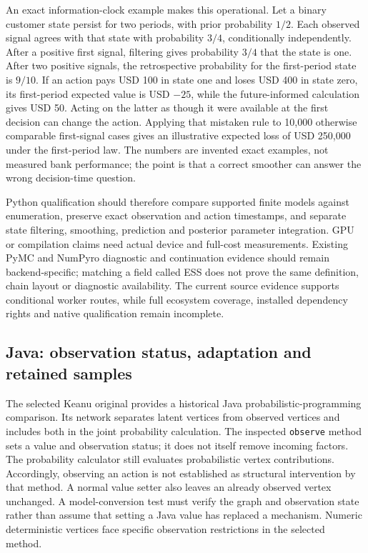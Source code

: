 An exact information-clock example makes this operational. Let a binary customer state persist for two periods, with prior probability $1/2$. Each observed signal agrees with that state with probability $3/4$, conditionally independently. After a positive first signal, filtering gives probability $3/4$ that the state is one. After two positive signals, the retrospective probability for the first-period state is $9/10$. If an action pays USD 100 in state one and loses USD 400 in state zero, its first-period expected value is USD $-25$, while the future-informed calculation gives USD 50. Acting on the latter as though it were available at the first decision can change the action. Applying that mistaken rule to 10,000 otherwise comparable first-signal cases gives an illustrative expected loss of USD 250,000 under the first-period law. The numbers are invented exact examples, not measured bank performance; the point is that a correct smoother can answer the wrong decision-time question.~\citep{exec25_bsw_choice}

Python qualification should therefore compare supported finite models against enumeration, preserve exact observation and action timestamps, and separate state filtering, smoothing, prediction and posterior parameter integration. GPU or compilation claims need actual device and full-cost measurements. Existing PyMC and NumPyro diagnostic and continuation evidence should remain backend-specific; matching a field called ESS does not prove the same definition, chain layout or diagnostic availability. The current source evidence supports conditional worker routes, while full ecosystem coverage, installed dependency rights and native qualification remain incomplete.~\citep{exec23_pymc_sources,exec23_numpyro_sources,exec25_bsw_choice}

\subsection{Java: observation status, adaptation and retained samples}

The selected Keanu original provides a historical Java probabilistic-programming comparison. Its network separates latent vertices from observed vertices and includes both in the joint probability calculation. The inspected \texttt{observe} method sets a value and observation status; it does not itself remove incoming factors. The probability calculator still evaluates probabilistic vertex contributions. Accordingly, observing an action is not established as structural intervention by that method. A normal value setter also leaves an already observed vertex unchanged. A model-conversion test must verify the graph and observation state rather than assume that setting a Java value has replaced a mechanism. Numeric deterministic vertices face specific observation restrictions in the selected method.~\citep{exec25_bsw_keanu}

